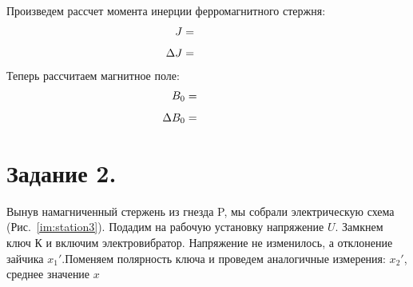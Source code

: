 \documentclass{physlab}
\begin{document}
	Произведем рассчет момента инерции ферромагнитного стержня:
	\begin{align*} 
		J=\val \\[1ex] 
		\Delta J=\val 
	\end{align*}
	Теперь рассчитаем магнитное поле: 
	\begin{align*}
	B_0 &= \val \\[1ex] 
	\Delta B_0 &= \val
	\end{align*}	
	\section*{Задание 2.}
	Вынув намагниченный стержень из гнезда P, мы собрали электрическую схема (Рис.~\ref{im:station3}). Подадим на рабочую установку напряжение $U$. Замкнем ключ К и включим электровибратор. Напряжение не изменилось, а отклонение зайчика $x_1'$.Поменяем полярность ключа и проведем аналогичные измерения: $x_2'$, среднее значение $x$
	
\end{document}
